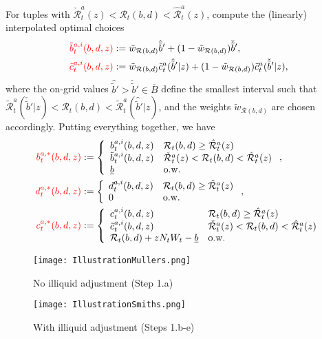 \documentclass[11pt]{article} %
\begin{document}
\begin{enumerate}[a.)]
For tuples with $\check{\mathcal{R}}_t^a(z) < \mathcal{R}_t(b,d) < \hat{\mathcal{R}}_t^a(z)$, compute the (linearly) interpolated optimal choices
\begin{align}
\textcolor{red}{\tilde{b}_t^{a,i}(b,d,z)} &:= \tilde{w}_{\mathcal{R}(b,d)}\hat{\tilde{b}}' + (1-\tilde{w}_{\mathcal{R}(b,d)})\check{\tilde{b}}',\\
\textcolor{red}{\tilde{c}_t^{a,i}(b,d,z)} &:= \tilde{w}_{\mathcal{R}(b,d)}\tilde{c}^a_t(\hat{\tilde{b}}'|z) + (1-\tilde{w}_{\mathcal{R}(b,d)})\tilde{c}^a_t(\check{\tilde{b}}'|z),
\end{align}
where the on-grid values $\hat{\tilde{b}}' > \check{\tilde{b}}'\in\overline{B}$ define the smallest interval such that $\tilde{\mathcal{R}}^a_t(\check{\tilde{b}}'|z) < \mathcal{R}_t(b,d) < \tilde{\mathcal{R}}^a_t(\hat{\tilde{b}}'|z)$, and the weights $\tilde{w}_{\mathcal{R}(b,d)}$ are chosen accordingly. Putting everything together, we have
\begin{align}
\textcolor{red}{b_t^{a,*}(b,d,z)} &:= \left\{ \begin{array}{ll} b^{a,i}_t(b,d,z) & \mathcal{R}_t(b,d) \geq \hat{\mathcal{R}}^a_t(z) \\ \tilde{b}^{a,i}_t(b,d,z) &  \check{\mathcal{R}}^a_t(z) < \mathcal{R}_t(b,d) < \hat{\mathcal{R}}^a_t(z) \\ \underline{b} & \text{o.w.} \end{array}  \right., \\
\textcolor{red}{d_t^{a,*}(b,d,z)} &:= \left\{ \begin{array}{ll} d^{a,i}_t(b,d,z) &\mathcal{R}_t(b,d) \geq \hat{\mathcal{R}}^a_t(z) \\ 0 & \text{o.w.} \end{array}  \right., \\
\textcolor{red}{c_t^{a,*}(b,d,z)} &:= \left\{ \begin{array}{ll} c^{a,i}_t(b,d,z) & \mathcal{R}_t(b,d) \geq \hat{\mathcal{R}}^a_t(z) \\ \tilde{c}^{a,i}_t(b,d,z) &  \check{\mathcal{R}}^a_t(z) < \mathcal{R}_t(b,d) < \hat{\mathcal{R}}^a_t(z) \\ \mathcal{R}_t(b,d) + zN_tW_t - \underline{b} & \text{o.w.} \end{array}  \right. 
\end{align}
\end{enumerate}
\begin{figure}
\centering
\caption{No illiquid adjustment (Step 1.a)}
\texttt{[image: IllustrationMullers.png]}
\end{figure}
\begin{figure}
\centering
\caption{With illiquid adjustment (Steps 1.b-e)}
\texttt{[image: IllustrationSmiths.png]}
\end{figure}
\newpage
\end{document}
